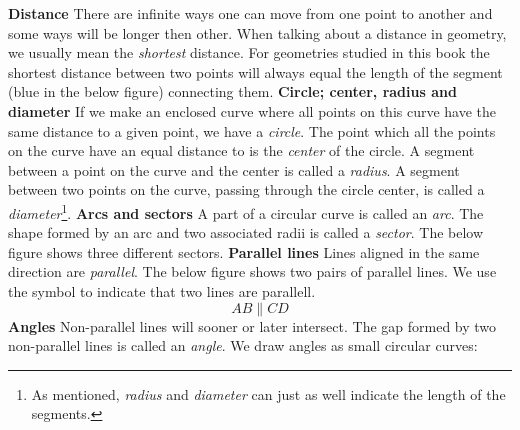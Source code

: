 \newpage
{}
\newpage
\textbf{Distance}\os
There are infinite ways one can move from one point to another and some ways will be longer then other. When talking about a distance in geometry, we usually mean the \textsl{shortest} distance. For geometries studied in this book the shortest distance between two points will always equal the length of the segment (blue in the below figure) connecting them.
\textbf{Circle; center, radius and diameter} \os
If we make an enclosed curve where all points on this curve have the same distance to a given point, we have a \textit{circle}. The point which all the points on the curve have an equal distance to is the \textit{center} of the circle. A segment between a point on the curve and the center is called a \textit{radius}. A segment between two points on the curve, passing through the circle center, is called a \textit{diameter}\footnote{As mentioned, \textit{radius} and \textit{diameter} can just as well indicate the length of the segments.}.
\textbf{Arcs and sectors} \os
A part of a circular curve is called an \textit{arc}. The shape formed by an arc and two associated radii is called a \textit{sector}. The below figure shows three different sectors.
\newpage
\textbf{Parallel lines}\os
Lines aligned in the same direction are \textit{parallel}. The below figure shows two pairs of parallel lines.
We use the symbol \sym{$ \parallel $} to indicate that two lines are parallell.
\[ AB\parallel CD \]
\textbf{Angles} \label{vinklar}\os
Non-parallel lines will sooner or later intersect. The gap formed  by two non-parallel lines is called an \textit{angle}. We draw angles as small circular curves:
